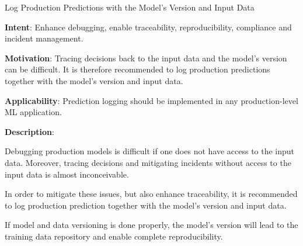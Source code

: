   
  \begin{frame}[plain]{ Log Production Predictions with the Model's Version and Input Data
 }

  \textbf{Intent}: Enhance debugging, enable traceability, reproducibility, compliance and incident management. 
 

  \textbf{Motivation}: Tracing decisions back to the input data and the model's version can be difficult. It is therefore recommended to log production predictions together with the model's version and input data.  
 

  \textbf{Applicability}: Prediction logging should be implemented in any production-level ML application.
 

  \textbf{Description}: 

Debugging production models is difficult if one does not have access to the input data.
Moreover, tracing decisions and mitigating incidents without access to the input data is almost inconceivable.


In order to mitigate these issues, but also enhance traceability, it is recommended to log production prediction together with the model's version and input data.


If model and data versioning is done properly, the model's version will lead to the training data repository and enable complete reproducibility.


 


  \end{frame}

  